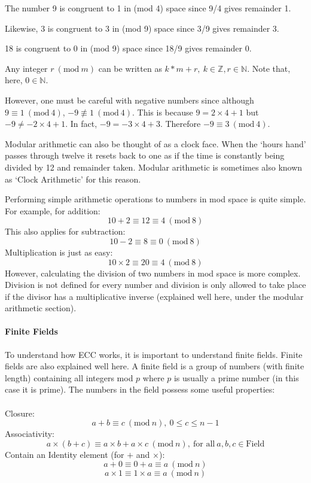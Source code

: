 \documentclass{article}
\begin{document}
The number 9 is congruent to 1 in (mod 4) space since 9/4 gives remainder 1.

Likewise, 3 is congruent to 3 in (mod 9) space since 3/9 gives remainder 3.

18 is congruent to 0 in (mod 9) space since 18/9 gives remainder 0.

Any integer $r\ (\textrm{mod}\ m)$ can be written as $k*m+r,\ k \in \mathbb{Z}, r \in \mathbb{N}$. Note that, here, $0 \in \mathbb{N}$.

However, one must be careful with negative numbers since although $9 \equiv 1\ (\textrm{mod}\ 4)$, $-9 \not\equiv 1\ (\textrm{mod}\ 4)$. This is because $9=2\times4+1$ but $-9\not=-2\times4+1$. In fact, $-9=-3\times4+3$. Therefore $-9 \equiv 3\ (\textrm{mod}\ 4)$.

Modular arithmetic can also be thought of as a clock face. When the `hours hand' passes through twelve it resets back to one as if the time is constantly being divided by 12 and remainder taken. Modular arithmetic is sometimes also known as `Clock Arithmetic' for this reason.

Performing simple arithmetic operations to numbers in mod space is quite simple. For example, for addition: \[10+2 \equiv 12 \equiv 4\ (\textrm{mod}\ 8)\]This also applies for subtraction: \[10-2 \equiv 8 \equiv 0\ (\textrm{mod}\ 8)\] Multiplication is just as easy: \[10\times 2 \equiv 20 \equiv 4\ (\textrm{mod}\ 8)\]
However, calculating the division of two numbers in mod space is more complex. Division is not defined for every number and division is only allowed to take place if the divisor has a multiplicative inverse (explained well here\cite{ic_encryption_course}, under the modular arithmetic section).

\paragraph{Finite Fields}
To understand how ECC works, it is important to understand finite fields. Finite fields are also explained well here\cite{ic_encryption_course}. A finite field is a group of numbers (with finite length) containing all integers mod $p$ where $p$ is usually a prime number (in this case it is prime). The numbers in the field possess some useful properties:\\
\\Closure:
\[a+b \equiv c\ (\textrm{mod}\ n),\ 0 \leq c \leq n-1\]
Associativity:
\[a\times (b + c) \equiv a\times b + a\times c\ (\textrm{mod}\ n),\ \textrm{for all}\ a,b,c \in \textrm{Field}\]
Contain an Identity element (for $+$ and $\times$):
\[a+0 \equiv 0+a \equiv a\ (\textrm{mod}\ n)\]
\[a\times 1 \equiv 1\times a \equiv a\ (\textrm{mod}\ n)\]
\end{document}
